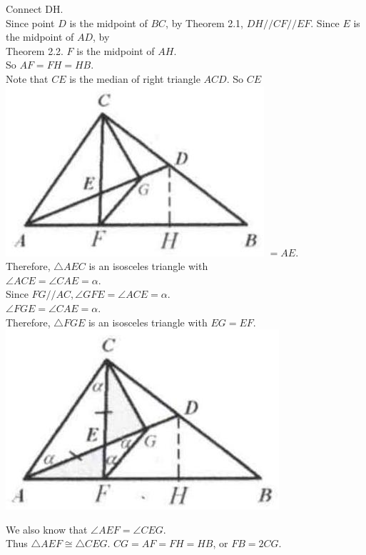\documentclass{article}
\begin{document}
Connect DH.\\
Since point \(D\) is the midpoint of \(B C\), by Theorem 2.1, \(D H / / C F / / E F\). Since \(E\) is the midpoint of \(A D\), by\\
Theorem 2.2. \(F\) is the midpoint of \(A H\).\\
So \(A F=F H=H B\).\\
Note that \(C E\) is the median of right triangle \(A C D\). So \(C E\)\\
\includegraphics[width=\textwidth]{images/040.jpg} \(=A E\).\\
Therefore, \(\triangle A E C\) is an isosceles triangle with\\
\(\angle A C E=\angle C A E=\alpha\).\\
Since \(F G / / A C, \angle G F E=\angle A C E=\alpha\).\\
\(\angle F G E=\angle C A E=\alpha\).\\
Therefore, \(\triangle F G E\) is an isosceles triangle with \(E G=E F\).\\
\centering
\includegraphics[width=\textwidth]{images/040(3).jpg}

We also know that \(\angle A E F=\angle C E G\).\\
Thus \(\triangle A E F \cong \triangle C E G\). \(C G=A F=F H=H B\), or \(F B=2 C G\).\\
\end{document}

